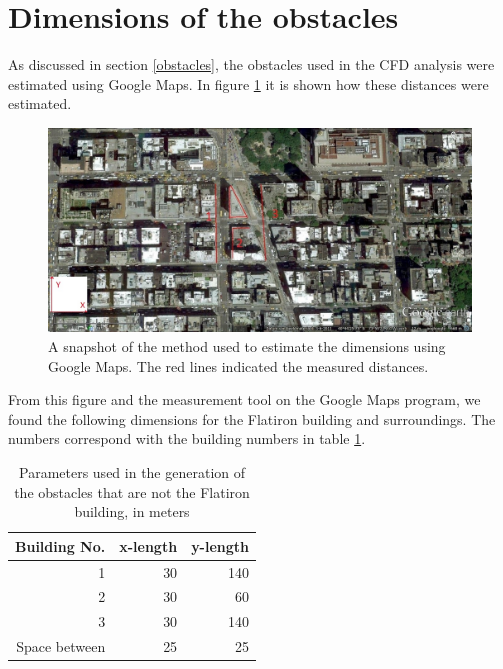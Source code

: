 \clearpage\appendix
\section{Dimensions of the obstacles}
\label{appendixdimensions}
As discussed in section \ref{obstacles}, the obstacles used in the CFD analysis were estimated using Google Maps. In figure \ref{maps} it is shown how these distances were estimated. 
\begin{figure}[hp]
\centering
\includegraphics[width = \textwidth]{flatironafschatting.jpg}
\caption{A snapshot of the method used to estimate the dimensions using Google Maps. The red lines indicated the measured distances. }
\label{maps}
\end{figure}
From this figure and the measurement tool on the Google Maps program, we found the following dimensions for the Flatiron building and surroundings. The numbers correspond with the building numbers in table \ref{measurements}.\\
\begin{table}[ht!]
\centering
\caption{Parameters used in the generation of the obstacles that are not the Flatiron building, in meters}
\begin{tabular}{  r  r  r }
\hline
Building No. & x-length & y-length\\
\hline 
1 & 30 & 140 \\
2 & 30 & 60 \\
3 & 30 & 140 \\
Space between & 25 & 25 \\
\hline
\end{tabular}
\label{measurements}
\end{table}\\
%
%
